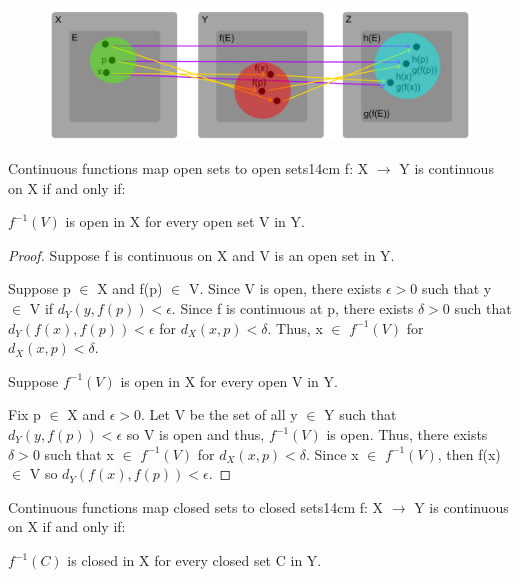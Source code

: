     \begin{figure}[h]
        \centering
        \includegraphics[scale=0.37]{Images/11.2.3.png}
    \end{figure}

    \newpage



    \begin{wtheorem}{Continuous functions map open sets to open sets}{14cm}
        f: X $\rightarrow$ Y is continuous on X if and only if:

        \hspace{1cm}
        $f^{-1}(V)$ is open in X for every open set V in Y.
    \end{wtheorem}

    \begin{proof}
        Suppose f is continuous on X and V is an open set in Y.

        Suppose p $\in$ X and f(p) $\in$ V.
        Since V is open, there exists $\epsilon > 0$ such that
        y $\in$ V if $d_Y(y,f(p)) < \epsilon$.
        Since f is continuous at p, there exists $\delta > 0$ such that
        $d_Y(f(x),f(p)) < \epsilon$ for $d_X(x,p) < \delta$.
        Thus, x $\in$ $f^{-1}(V)$ for $d_X(x,p) < \delta$.

        \vspace{0.2cm}

        Suppose $f^{-1}(V)$ is open in X for every open V in Y.

        Fix p $\in$ X and $\epsilon > 0$.
        Let V be the set of all y $\in$ Y such that $d_Y(y,f(p)) < \epsilon$
        so V is open and thus, $f^{-1}(V)$ is open.
        Thus, there exists $\delta > 0$ such that x $\in$ $f^{-1}(V)$
        for $d_X(x,p) < \delta$.
        Since x $\in$ $f^{-1}(V)$, then f(x) $\in$ V
        so $d_Y(f(x),f(p)) < \epsilon$.
    \end{proof}

    \vspace{0.5cm}



    \begin{corollary}{Continuous functions map closed sets to closed sets}{14cm}
        f: X $\rightarrow$ Y is continuous on X if and only if:

        \hspace{1cm}
        $f^{-1}(C)$ is closed in X for every closed set C in Y.        
    \end{corollary}

